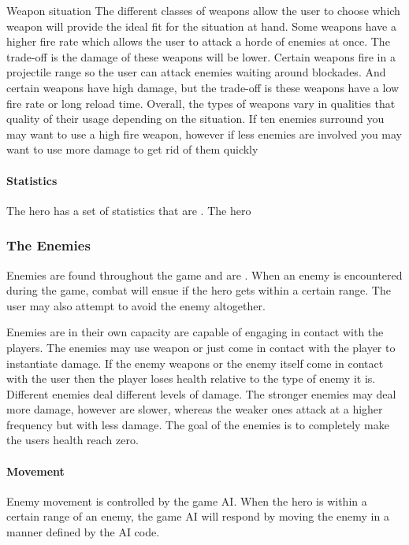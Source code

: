 \documentclass[12pt, titlepage]{article}
\begin{document}
Weapon situation
The different classes of weapons allow the user to choose which weapon will provide the ideal fit for the situation at hand. Some weapons have a higher fire rate which allows the user to attack a horde of enemies at once. The trade-off is the damage of these weapons will be lower. Certain weapons fire in a projectile range so the user can attack enemies waiting around blockades. And certain weapons have high damage, but the trade-off is these weapons have a low fire rate or long reload time. Overall, the types of weapons vary in qualities that quality of their usage depending on the situation. If ten enemies surround you may want to use a high fire weapon, however if less enemies are involved you may want to use more damage to get rid of them quickly

\paragraph{Statistics}
The hero has a set of statistics that are .  The hero








\subsubsection{The Enemies}
Enemies are found throughout the game and are .  When an enemy is encountered during the game, combat will ensue if the hero gets within a certain range.  The user may also attempt to avoid the enemy altogether.

Enemies are in their own capacity are capable of engaging in contact with the players. The enemies may use weapon or just come in contact with the player to instantiate damage. If the enemy weapons or the enemy itself come in contact with the user then the player loses health relative to the type of enemy it is. Different enemies deal different levels of damage. The stronger enemies may deal more damage, however are slower, whereas the weaker ones attack at a higher frequency but with less damage. The goal of the enemies is to completely make the users health reach zero.

\paragraph{Movement}
Enemy movement is controlled by the game AI.  When the hero is within a certain range of an enemy, the game AI will respond by moving the enemy in a manner defined by the AI code.
\end{document}
